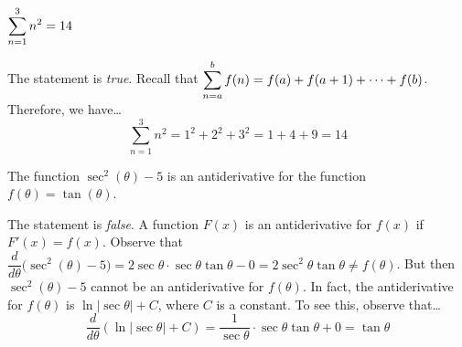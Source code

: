 \documentclass[11pt,letterpaper]{article}
\begin{document}
 $\displaystyle\sum_{n=1}^3 n^2= 14$ \pspace

\sol The statement is \textit{true}. Recall that $\displaystyle\sum_{n=a}^b f(n)= f(a) + f(a + 1) + \cdots + f(b)$. Therefore, we have\dots
	\[
	\sum_{n=1}^3 n^2= 1^2 + 2^2 + 3^2= 1 + 4 + 9= 14
	\] \pvspace{1.3cm}



 The function $\sec^2(\theta) - 5$ is an antiderivative for the function $f(\theta)= \tan(\theta)$. \pspace

\sol The statement is \textit{false}. A function $F(x)$ is an antiderivative for $f(x)$ if $F'(x)= f(x)$. Observe that $\dfrac{d}{d\theta} \big( \sec^2(\theta) - 5 \big)= 2 \sec \theta \cdot \sec \theta \tan \theta - 0= 2 \sec^2 \theta \tan \theta \neq f(\theta)$. But then $\sec^2(\theta) - 5$ cannot be an antiderivative for $f(\theta)$. In fact, the antiderivative for $f(\theta)$ is $\ln|\sec \theta| + C$, where $C$ is a constant. To see this, observe that\dots
	\[
	\dfrac{d}{d\theta} \left( \ln|\sec \theta| + C \right)= \dfrac{1}{\sec \theta} \cdot \sec \theta \tan \theta + 0= \tan \theta
	\] \pvspace{1.3cm}
\end{document}
